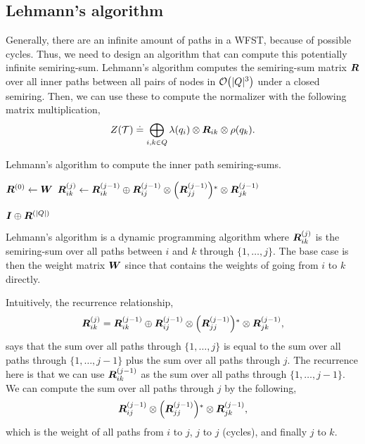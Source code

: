 \subsection{Lehmann's algorithm}

Generally, there are an infinite amount of paths in a WFST, because of possible
cycles. Thus, we need to design an algorithm that can compute this potentially
infinite semiring-sum. Lehmann's algorithm \citep{lehmann1977algebraic}
computes the semiring-sum matrix $\bm{R}$ over all inner paths between all
pairs of nodes in $\bigo{|Q|^3}$ under a closed semiring. Then, we can use
these to compute the normalizer with the following matrix multiplication, \[
  Z(\mathcal{T}) \doteq \bigoplus_{i,k \in Q} \lambda(q_i) \otimes \bm{R}_{ik} \otimes \rho(q_k)
.\]

\begin{algorithm}
  \caption{Lehmann's algorithm to compute the inner path semiring-sums.}
  \label{alg:lehmann}

  \begin{algorithmic}[1]
      \State $\bm{R}^{(0)} \gets \bm{W}$
            \State $\mat{R}_{ik}^{(j)} \gets \mat{R}_{ik}^{(j-1)} \oplus \mat{R}_{ij}^{(j-1)} \otimes \lft( \mat{R}_{jj}^{(j-1)} \rgt)^* \otimes \mat{R}_{jk}^{(j-1)}$
          \EndFor
        \EndFor
      \EndFor

      \State \Return $\bm{I} \oplus \bm{R}^{(|Q|)}$
    \EndFunction
  \end{algorithmic}
\end{algorithm}

Lehmann's algorithm is a dynamic programming algorithm where
$\bm{R}_{ik}^{(j)}$ is the semiring-sum over all paths between $i$ and $k$
through $\{ 1,\ldots, j \}$. The base case is then the weight matrix $\bm{W}$
since that contains the weights of going from $i$ to $k$ directly.

Intuitively, the recurrence relationship, \[
  \mat{R}_{ik}^{(j)} = \mat{R}_{ik}^{(j-1)} \oplus \mat{R}_{ij}^{(j-1)} \otimes \lft( \mat{R}_{jj}^{(j-1)} \rgt)^* \otimes \mat{R}_{jk}^{(j-1)}
,\]
says that the sum over all paths through $\{ 1,\ldots,j \}$ is equal to the sum
over all paths through $\{ 1,\ldots,j-1 \}$ plus the sum over all paths through
$j$. The recurrence here is that we can use $\bm{R}_{ik}^{(j-1)}$ as the sum
over all paths through $\{ 1,\ldots,j-1 \}$. We can compute the sum over all
paths through $j$ by the following, \[
  \mat{R}_{ij}^{(j-1)} \otimes \lft( \mat{R}_{jj}^{(j-1)} \rgt)^* \otimes \mat{R}_{jk}^{(j-1)}
,\]
which is the weight of all paths from $i$ to $j$, $j$ to $j$ (cycles), and
finally $j$ to $k$.

